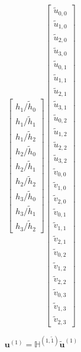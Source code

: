 \documentclass[a4paper,10pt]{scrreprt}
\begin{document}
\begin{equation}
\begin{bmatrix}
        h_1 / \tilde{h}_0 \\
        h_1 / \tilde{h}_1 \\
        h_1 / \tilde{h}_2 \\
        h_2 / \tilde{h}_0 \\
        h_2 / \tilde{h}_1 \\
        h_2 / \tilde{h}_2 \\
        h_3 / \tilde{h}_0 \\
        h_3 / \tilde{h}_1 \\
        h_3 / \tilde{h}_2
    \end{bmatrix}
    \begin{bmatrix}
        \tilde{u}_{0,0} \\
        \tilde{u}_{1,0} \\
        \tilde{u}_{2,0} \\
        \tilde{u}_{3,0} \\
        \tilde{u}_{0,1} \\
        \tilde{u}_{1,1} \\
        \tilde{u}_{2,1} \\
        \tilde{u}_{3,1} \\
        \tilde{u}_{0,2} \\
        \tilde{u}_{1,2} \\
        \tilde{u}_{2,2} \\
        \tilde{u}_{3,2} \\
        \tilde{v}_{0,0} \\
        \tilde{v}_{1,0} \\
        \tilde{v}_{2,0} \\
        \tilde{v}_{0,1} \\
        \tilde{v}_{1,1} \\
        \tilde{v}_{2,1} \\
        \tilde{v}_{0,2} \\
        \tilde{v}_{1,2} \\
        \tilde{v}_{2,2} \\
        \tilde{v}_{0,3} \\
        \tilde{v}_{1,3} \\
        \tilde{v}_{2,3}
    \end{bmatrix}
\end{equation}

\begin{equation}
    \mathbf{u}^{(1)} = \mathbb{H}^{(1,\tilde{1})} \mathbf{\tilde{u}}^{(1)}
\end{equation}
\end{document}
